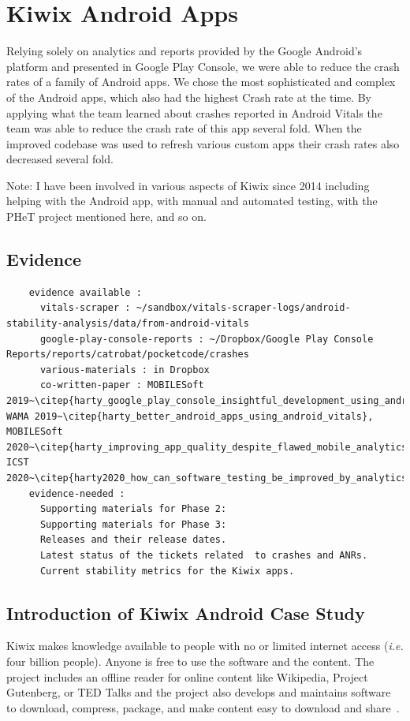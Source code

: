 

\section{Kiwix Android Apps}
\label{section-kiwix-case-study}
Relying solely on analytics and reports provided by the Google Android's platform and presented in Google Play Console, we were able to reduce the crash rates of a family of Android apps. 
%
We chose the most sophisticated and complex of the Android apps, which also had the highest Crash rate at the time. By applying what the team learned about crashes reported in Android Vitals the team was able to reduce the crash rate of this app several fold. When the improved codebase was used to refresh various custom apps their crash rates also decreased several fold.

Note: I have been involved in various aspects of Kiwix since 2014 including helping with the Android app, with manual and automated testing, with the PHeT project mentioned here, and so on.


\subsection*{Evidence}
  \begin{verbatim}
    evidence available :
      vitals-scraper : ~/sandbox/vitals-scraper-logs/android-stability-analysis/data/from-android-vitals
      google-play-console-reports : ~/Dropbox/Google Play Console Reports/reports/catrobat/pocketcode/crashes
      various-materials : in Dropbox
      co-written-paper : MOBILESoft 2019~\citep{harty_google_play_console_insightful_development_using_android_vitals_and_pre_launch_reports}, WAMA 2019~\citep{harty_better_android_apps_using_android_vitals}, MOBILESoft 2020~\citep{harty_improving_app_quality_despite_flawed_mobile_analytics}, ICST 2020~\citep{harty2020_how_can_software_testing_be_improved_by_analytics_to_deliver_better_apps}.
    evidence-needed : 
      Supporting materials for Phase 2:
      Supporting materials for Phase 3: 
      Releases and their release dates.
      Latest status of the tickets related  to crashes and ANRs.
      Current stability metrics for the Kiwix apps.
  \end{verbatim}

\subsection{Introduction of Kiwix Android Case Study}
Kiwix makes knowledge available to people with no or limited internet access (\emph{i.e.} four billion people). Anyone is free to use the software and the content. The project includes an offline reader for online content like Wikipedia, Project Gutenberg, or TED Talks and the project also develops and maintains software to download, compress, package, and make content easy to download and share~\citep{kiwix_about_the_project, gomez2017_wikimedia_kiwix_article}.

